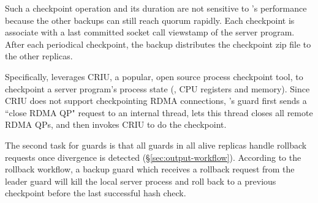 Such a checkpoint operation and its duration are not sensitive to \xxx's 
performance because the other backups can still reach quorum rapidly. Each 
checkpoint is associate with a last committed socket call viewstamp of the 
server program. After each periodical checkpoint, the backup distributes the 
checkpoint zip file to the other replicas.

Specifically, \xxx leverages CRIU, a popular, open source process checkpoint 
tool, to checkpoint a server program's process state (\eg, CPU registers and 
memory). Since CRIU does not support checkpointing RDMA connections, \xxx's 
guard first sends a ``close RDMA QP" request to an \xxx internal thread, lets 
this thread closes all remote RDMA QPs, and then invokes CRIU to do the 
checkpoint.

The second task for guards is that all guards in all alive replicas handle 
rollback requests once divergence is detected (\S\ref{sec:output-workflow}). 
According to the rollback workflow, a backup guard which receives a rollback 
request from the leader guard will kill the local server process and roll back 
to a previous checkpoint before the last successful hash check.










% 


